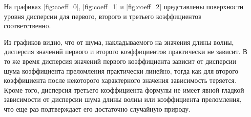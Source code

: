 \documentclass[12pt,a4paper]{article}
\begin{document}
\begin{table}[h]
  \centering
  \caption{Значения матожидания и стандартного отклонения для третьего коэффициента}
  \label{tabl:stability3}
\end{table}

На графиках \ref{fig:coeff_0}, \ref{fig:coeff_1} и \ref{fig:coeff_2} представлены
поверхности уровня дисперсии для первого, второго и третьего коэффициентов соответственно.

Из графиков видно, что от шума, накладываемого на значения длины волны, дисперсия значений
первого и второго коэффициентов практически не зависит. В то же время дисперсия значений
первого коэффициента зависит от дисперсии шума коэффициента преломления практически линейно,
тогда как для второго коэффициента после некоторого характерного значения зависимость теряется.
Кроме того, дисперсия третьего коэффициента формулы не имеет явной гладкой зависимости от
дисперсии шума длины волны или коэффициента преломления, что еще раз подтверждает его достаточно
случайную природу.
\end{document}
